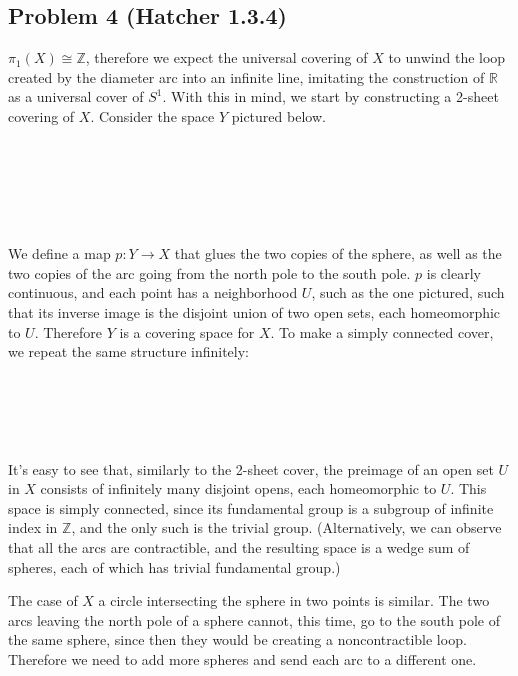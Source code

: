 \documentclass[12 pt]{article}
\newcommand{\R}{\mathbb{R}}
\newcommand{\Z}{\mathbb{Z}}
\begin{document}
\subsection*{Problem 4 (Hatcher 1.3.4)}
$\pi_1(X) \cong \Z$, therefore we expect the universal covering of $X$ to unwind the loop created by the diameter arc into an infinite line, imitating the construction of $\R$ as a universal cover of $S^1$. With this in mind, we start by constructing a 2-sheet covering of $X$. Consider the space $Y$ pictured below.
\\
\\
\\
\\
\\
\\
\\
We define a map $p: Y \to X$ that glues the two copies of the sphere, as well as the two copies of the arc going from the north pole to the south pole. $p$ is clearly continuous, and each point has a neighborhood $U$, such as the one pictured, such that its inverse image is the disjoint union of two open sets, each homeomorphic to $U$. Therefore $Y$ is a covering space for $X$. To make a simply connected cover, we repeat the same structure infinitely:
\\
\\
\\
\\
\\
\\
It's easy to see that, similarly to the 2-sheet cover, the preimage of an open set $U$ in $X$ consists of infinitely many disjoint opens, each homeomorphic to $U$. This space is simply connected, since its fundamental group is a subgroup of infinite index in $\Z$, and the only such is the trivial group. (Alternatively, we can observe that all the arcs are contractible, and the resulting space is a wedge sum of spheres, each of which has trivial fundamental group.)

The case of $X$ a circle intersecting the sphere in two points is similar. The two arcs leaving the north pole of a sphere cannot, this time, go to the south pole of the same sphere, since then they would be creating a noncontractible loop. Therefore we need to add more spheres and send each arc to a different one.
\\
\\
\\
\\
\\
\\
\\
\\
\\
\\
\\
\\
\\
\\
\\
\\
\end{document}
